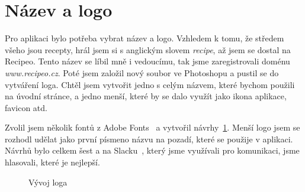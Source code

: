 \section{Název a logo}
Pro aplikaci bylo potřeba vybrat název a logo. Vzhledem k tomu, že středem všeho jsou recepty, hrál jsem si s anglickým slovem
\emph{recipe}, až jsem se dostal na Recipeo. Tento název se líbil mně i vedoucímu, tak jsme zaregistrovali doménu \emph{www.recipeo.cz}.
Poté jsem založil nový soubor ve Photoshopu a pustil se do vytváření loga. Chtěl jsem vytvořit jedno s celým názvem, které bychom použili
na úvodní stránce, a jedno menší, které by se dalo využít jako ikona aplikace, favicon atd.

Zvolil jsem několik fontů z Adobe Fonts~\cite{AdobeFonts} a vytvořil návrhy~\ref{picture:recipeo:logos}. Menší logo jsem se rozhodl udělat jako první písmeno názvu na pozadí,
které se použije v aplikaci. Návrhů bylo celkem šest a na Slacku~\cite{Slack}, který jsme využívali pro komunikaci, jsme hlasovali, které je nejlepší.

\begin{figure}[h]
    \centering
    \hfill
    \hfill
    \hfill
    \caption{Vývoj loga}
    \label{picture:recipeo:logos}
\end{figure}

